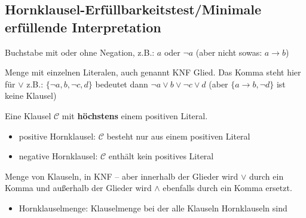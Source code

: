 \documentclass[
    ngerman,
    color=3b,
    summary,
    boxarc,
    main,
    fleqn,
    leqno,
]{rubos-tuda-template}
\begin{document}
    \subsection{Hornklausel-Erfüllbarkeitstest/Minimale erfüllende Interpretation}
    \begin{definition}[Literal]
        Buchstabe mit oder ohne Negation, z.B.: $a$ oder $\lnot a$ (aber nicht sowas: $a\rightarrow{}b$)
    \end{definition}
    \begin{definition}[Klausel]
        Menge mit einzelnen Literalen, auch genannt KNF Glied. Das Komma steht hier für $\lor$ z.B.:
        $\{\lnot a, b,\lnot c, d\}$ bedeutet dann $\lnot a\lor b\lor\lnot c\lor d$ (aber $\{a\rightarrow{}b,\lnot d\}$ ist keine Klausel)
    \end{definition}
    \begin{definition}[Hornklausel]
        Eine Klausel $\mathcal{C}$ mit \textbf{höchstens} einem positiven Literal.
        \begin{itemize}
            \item positive Hornklausel: $\mathcal{C}$ besteht nur aus einem positiven Literal
            \item negative Hornklausel: $\mathcal{C}$ enthält kein positives Literal
        \end{itemize}
    \end{definition}
    \begin{definition}[Klauselmenge]
        Menge von Klauseln, in KNF -- aber innerhalb der Glieder wird $\lor$ durch ein Komma und außerhalb der Glieder wird $\land$ ebenfalls durch ein Komma ersetzt.
        \begin{itemize}
            \item Hornklauselmenge: Klauselmenge bei der alle Klauseln Hornklauseln sind
        \end{itemize}
    \end{definition}
\end{document}
